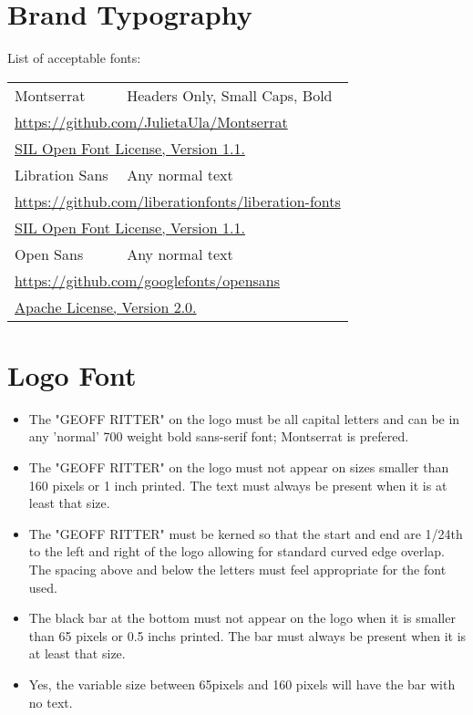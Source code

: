 \documentclass{logo_styleguide}
\begin{document}
\section{Brand Typography}
List of acceptable fonts:\\
\begin{tabular}{ll}
Montserrat & Headers Only, Small Caps, Bold\\
\multicolumn{2}{l}{\url{https://github.com/JulietaUla/Montserrat}}\\
\multicolumn{2}{l}{\href{https://scripts.sil.org/cms/scripts/page.php?site_id=nrsi\&id=OFL}{SIL Open Font License, Version 1.1.}}\\[1em]

Libration Sans & Any normal text\\
\multicolumn{2}{l}{\url{https://github.com/liberationfonts/liberation-fonts}}\\
\multicolumn{2}{l}{\href{https://scripts.sil.org/cms/scripts/page.php?site_id=nrsi\&id=OFL}{SIL Open Font License, Version 1.1.}}\\[1em]

Open Sans & Any normal text\\
\multicolumn{2}{l}{\url{https://github.com/googlefonts/opensans}}\\
\multicolumn{2}{l}{\href{http://www.apache.org/licenses/LICENSE-2.0}{Apache License, Version 2.0.}}\\[1em]
\end{tabular}


\section{Logo Font}

\begin{itemize}
    \item The "GEOFF RITTER" on the logo must be all capital letters and can be in any 'normal' 700 weight bold sans-serif font; Montserrat is prefered.
    \item The "GEOFF RITTER" on the logo must not appear on sizes smaller than 160 pixels or 1 inch printed. The text
    must always be present when it is at least that size.
    \item The "GEOFF RITTER" must be kerned so that the start and end are 1/24th to the left and right of the logo
    allowing for standard curved edge overlap. The spacing above and below the letters must feel appropriate for the
    font used.
    \item The black bar at the bottom must not appear on the logo when it is smaller than 65 pixels or 0.5 inchs
    printed. The bar must always be present when it is at least that size.
    \item Yes, the variable size between 65pixels and 160 pixels will have the bar with no text.
\end{itemize}
\end{document}
